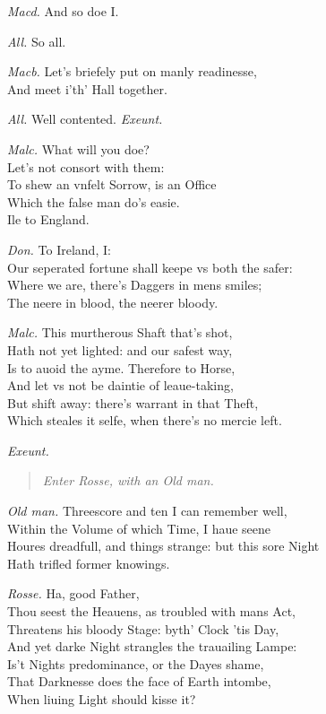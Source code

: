 \documentclass[12pt]{sides}
\newcommand{\StageDir}[1]{\begin{quote}\centering\em #1\end{quote}}
\newcommand{\clStageDir}[1]{\hspace*{\fill}\textit{#1}\hspace*{\fill}}
\newcommand{\elStageDir}[1]{\hfill\textit{#1}}
\newcommand{\dia}[1]{\hskip 15pt\textit{#1}\hskip 6pt}
\begin{document}
\begin{multicols}{2}
            \dia{Macd.} And so doe I.

            \dia{All.} So all.

            \dia{Macb.} Let's briefely put on manly readinesse, \\ And meet i'th' Hall together.

            \dia{All.} Well contented. \clStageDir{Exeunt.}

            \dia{Malc.} What will you doe? \\ Let's not consort with them: \\ To shew an vnfelt Sorrow, is an Office \\ Which the false man do's easie. \\ Ile to England.

            \dia{Don.} To Ireland, I: \\ Our seperated fortune shall keepe vs both the safer: \\ Where we are, there's Daggers in mens smiles; \\ The neere in blood, the neerer bloody.

            \dia{Malc.} This murtherous Shaft that's shot, \\ Hath not yet lighted: and our safest way, \\ Is to auoid the ayme. Therefore to Horse, \\ And let vs not be daintie of leaue-taking, \\ But shift away: there's warrant in that Theft, \\ Which steales it selfe, when there's no mercie left.

            \elStageDir{Exeunt.} \hspace{72pt}
            \StageDir{Enter Rosse, with an Old man.}
            \dia{Old man.} Threescore and ten I can remember well, \\ Within the Volume of which Time, I haue seene \\ Houres dreadfull, and things strange: but this sore Night \\ Hath trifled former knowings.

            \dia{Rosse.} Ha, good Father, \\ Thou seest the Heauens, as troubled with mans Act, \\ Threatens his bloody Stage: byth' Clock 'tis Day, \\ And yet darke Night strangles the trauailing Lampe: \\ Is't Nights predominance, or the Dayes shame, \\ That Darknesse does the face of Earth intombe, \\ When liuing Light should kisse it?


\end{multicols}
\end{document}
